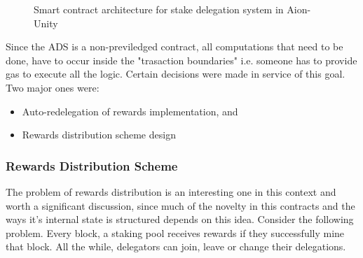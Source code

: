 \begin{figure}[ht]
\centering
{}
\caption{Smart contract architecture for stake delegation system in Aion-Unity}
\label{fig:contract_arch}
\end{figure}

Since the ADS is a non-previledged contract, all computations that need to be done, have to occur inside the "trasaction boundaries" i.e. someone has to provide gas to execute all the logic. Certain decisions were made in service of this goal. Two major ones were: 
\begin{itemize}[label=--,nosep]
    \item Auto-redelegation of rewards implementation, and 
    \item Rewards distribution scheme design
\end{itemize}

\subsubsection{Rewards Distribution Scheme}
The problem of rewards distribution is an interesting one in this context and worth a significant discussion, since much of the novelty in this contracts and the ways it's internal state is structured depends on this idea. Consider the following problem. Every block, a staking pool receives rewards if they successfully mine that block. All the while, delegators can join, leave or change their delegations. 

